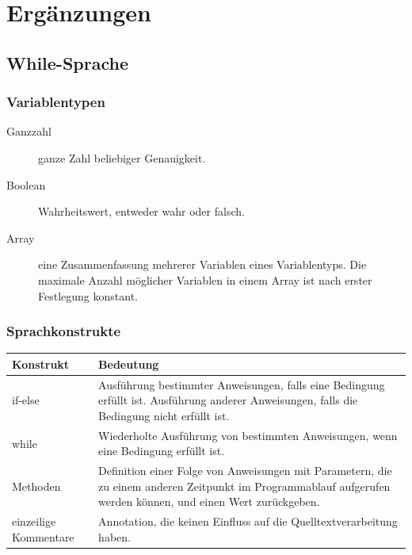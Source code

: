 \documentclass[a4paper,10pt]{article}
\begin{document}
\section{Ergänzungen}
\subsection{While-Sprache}
\subsubsection{Variablentypen}
\begin{description}
\item[Ganzzahl] ganze Zahl beliebiger Genauigkeit.
\item[Boolean] Wahrheitswert, entweder wahr oder falsch.
\item[Array] eine Zusammenfassung mehrerer Variablen eines Variablentyps. Die maximale Anzahl möglicher Variablen in einem Array ist nach erster Festlegung konstant.
\end{description}
\subsubsection{Sprachkonstrukte}
\begin{tabularx}{\textwidth}{| l | X |}
\hline
\textbf{Konstrukt} & \textbf{Bedeutung}\\
\hline
if-else & Ausführung bestimmter Anweisungen, falls eine Bedingung erfüllt ist. Ausführung anderer Anweisungen, falls die Bedingung nicht erfüllt ist.\\
\hline
while & Wiederholte Ausführung von bestimmten Anweisungen, wenn eine Bedingung erfüllt ist.\\
\hline
Methoden & Definition einer Folge von Anweisungen mit Parametern, die zu einem anderen Zeitpunkt im Programmablauf aufgerufen werden können, und einen Wert zurückgeben.\\
\hline
einzeilige Kommentare & Annotation, die keinen Einfluss auf die Quelltextverarbeitung haben.\\
\hline
\end{tabularx}
\end{document}
